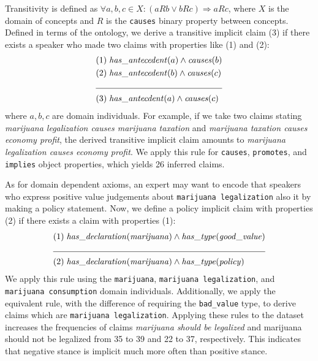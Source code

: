 Transitivity is defined as $\forall a, b, c \in X : (a R b \vee b R c)
\Rightarrow a R c$, where $X$ is the domain of concepts and $R$ is the
\texttt{causes} binary property between concepts. Defined in terms of the ontology, 
we derive a transitive implicit claim (3) if 
there exists a speaker who made two claims with properties like (1) and (2):
\begin{align*}
	(1) & \hspace{0.1cm} \mathit{has\_antecedent} (a)  \wedge  \mathit{causes} (b) \\
	(2) & \hspace{0.1cm} \mathit{has\_antecedent} (b) \wedge \mathit{causes} (c) \\
	\cline{1-3}
	(3) & \hspace{0.1cm} \mathit{has\_antecdent} (a) \wedge \mathit{causes} (c)
\end{align*}
where $a, b, c$ are domain individuals. For example, if we take two claims
stating
\emph{marijuana legalization causes marijuana taxation} and 
\emph{marijuana taxation causes economy profit}, the derived transitive
implicit claim amounts to \emph{marijuana legalization causes economy profit}.
We apply this rule for \texttt{causes}, \texttt{promotes}, and \texttt{implies}
object properties, which yields 26 inferred claims. 

As for domain dependent axioms, an expert may want to encode that 
speakers who express positive value judgements about 
\texttt{marijuana legalization} also  it by making 
a policy statement. 
Now, we define a policy implicit claim with properties (2)  if there
exists a claim with properties (1):
\begin{align*}
	(1) & \hspace{0.1cm} \mathit{has\_declaration} (\mathit{marijuana}) 
	\wedge \mathit{has\_type} (\mathit{good\_value})\\
	\cline{1-3}
	(2) & \hspace{0.1cm} \mathit{has\_declaration} (\mathit{marijuana}) 
	 \wedge \mathit{has\_type} (\mathit{policy})
\end{align*}
We apply this rule using the \texttt{marijuana}, \texttt{marijuana
legalization}, and \texttt{marijuana consumption} domain individuals.
Additionally, we apply the equivalent rule, with the difference of requiring
the \texttt{bad\_value} type, to derive claims which are 
\texttt{marijuana legalization}. Applying these rules to the dataset increases
the frequencies of claims \emph{marijuana should be legalized} and {marijuana
should not be legalized} from 35 to 39 and 22 to 37, respectively.  This
indicates that negative stance is implicit much more often than positive
stance. 

